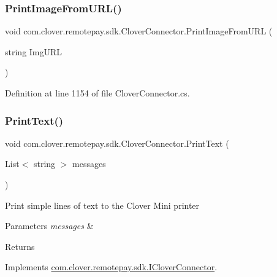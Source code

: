 \subsubsection{\texorpdfstring{Print\+Image\+From\+U\+R\+L()}{PrintImageFromURL()}}
{\footnotesize\ttfamily void com.\+clover.\+remotepay.\+sdk.\+Clover\+Connector.\+Print\+Image\+From\+U\+RL (\begin{DoxyParamCaption}\item[{string}]{Img\+U\+RL }\end{DoxyParamCaption})}



Definition at line 1154 of file Clover\+Connector.\+cs.

\mbox{\label{classcom_1_1clover_1_1remotepay_1_1sdk_1_1_clover_connector_a1601ef2709d1e2eb53fa92ff1ee46823}} 
\subsubsection{\texorpdfstring{Print\+Text()}{PrintText()}}
{\footnotesize\ttfamily void com.\+clover.\+remotepay.\+sdk.\+Clover\+Connector.\+Print\+Text (\begin{DoxyParamCaption}\item[{List$<$ string $>$}]{messages }\end{DoxyParamCaption})}



Print simple lines of text to the Clover Mini printer 


\begin{DoxyParams}{Parameters}
{\em messages} & \\
\hline
\end{DoxyParams}
\begin{DoxyReturn}{Returns}

\end{DoxyReturn}


Implements \hyperlink{interfacecom_1_1clover_1_1remotepay_1_1sdk_1_1_i_clover_connector_a16a2a91c231e7a66373b2c0e2f612951}{com.\+clover.\+remotepay.\+sdk.\+I\+Clover\+Connector}.



